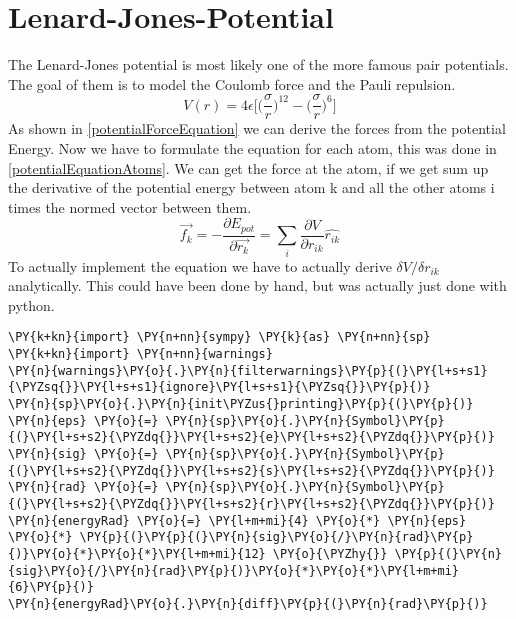 \section{Lenard-Jones-Potential}
\begin{comment}
- pair potential
\end{comment}
The Lenard-Jones potential is most likely one of the more famous pair potentials. The goal of them is to model the Coulomb force and the Pauli repulsion. 
\begin{equation}
	V(r) = 4\epsilon\bigg[\Big(\frac{\sigma}{r}\Big)^{12}- \Big(\frac{\sigma}{r}\Big)^{6} \bigg]
\end{equation}
As shown in \ref{potentialForceEquation} we can derive the forces from the potential Energy. Now we have to formulate the equation for each atom, this was done in \ref {potentialEquationAtoms}. We can get the force at the atom, if we get sum up the derivative of the potential energy between atom k and all the other atoms i times the normed vector between them. 
\begin{equation}
	\label{potentialEquationAtoms}
	\overrightarrow{f_{k}} = -\frac{\partial E_{pot}}{\partial  \overrightarrow{r_{k}}}=\sum_{i}^{}\frac{\partial V}{\partial r_{ik}} \hat{r_{ik}}
\end{equation}
To actually implement the equation we have to actually derive $\delta V/ \delta r_{ik}$ analytically. This could have been done by hand, but was actually just done with python. 
\begin{tcolorbox}[breakable, size=fbox, boxrule=1pt, pad at break*=1mm,colback=cellbackground, colframe=cellborder]
\begin{Verbatim}[commandchars=\\\{\}]
\PY{k+kn}{import} \PY{n+nn}{sympy} \PY{k}{as} \PY{n+nn}{sp}
\PY{k+kn}{import} \PY{n+nn}{warnings}
\PY{n}{warnings}\PY{o}{.}\PY{n}{filterwarnings}\PY{p}{(}\PY{l+s+s1}{\PYZsq{}}\PY{l+s+s1}{ignore}\PY{l+s+s1}{\PYZsq{}}\PY{p}{)}
\PY{n}{sp}\PY{o}{.}\PY{n}{init\PYZus{}printing}\PY{p}{(}\PY{p}{)}
\PY{n}{eps} \PY{o}{=} \PY{n}{sp}\PY{o}{.}\PY{n}{Symbol}\PY{p}{(}\PY{l+s+s2}{\PYZdq{}}\PY{l+s+s2}{e}\PY{l+s+s2}{\PYZdq{}}\PY{p}{)}
\PY{n}{sig} \PY{o}{=} \PY{n}{sp}\PY{o}{.}\PY{n}{Symbol}\PY{p}{(}\PY{l+s+s2}{\PYZdq{}}\PY{l+s+s2}{s}\PY{l+s+s2}{\PYZdq{}}\PY{p}{)}
\PY{n}{rad} \PY{o}{=} \PY{n}{sp}\PY{o}{.}\PY{n}{Symbol}\PY{p}{(}\PY{l+s+s2}{\PYZdq{}}\PY{l+s+s2}{r}\PY{l+s+s2}{\PYZdq{}}\PY{p}{)}
\PY{n}{energyRad} \PY{o}{=} \PY{l+m+mi}{4} \PY{o}{*} \PY{n}{eps} \PY{o}{*} \PY{p}{(}\PY{p}{(}\PY{n}{sig}\PY{o}{/}\PY{n}{rad}\PY{p}{)}\PY{o}{*}\PY{o}{*}\PY{l+m+mi}{12} \PY{o}{\PYZhy{}} \PY{p}{(}\PY{n}{sig}\PY{o}{/}\PY{n}{rad}\PY{p}{)}\PY{o}{*}\PY{o}{*}\PY{l+m+mi}{6}\PY{p}{)}
\PY{n}{energyRad}\PY{o}{.}\PY{n}{diff}\PY{p}{(}\PY{n}{rad}\PY{p}{)}
	\end{Verbatim}
\end{tcolorbox}

